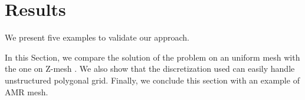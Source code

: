 \documentclass[preprint,10pt]{elsarticle}
\renewcommand{\(}{\left(}
\renewcommand{\)}{\right)}
\renewcommand{\[}{\left[}
\renewcommand{\]}{\right]}
\begin{document}
 
\section{Results} \label{sec:results}

We present five examples to validate our approach.  

In this Section, we compare the solution of the problem on an uniform mesh
with the one on Z-mesh \cite{Stone2003}. We also show that the
discretization used can easily handle unstructured polygonal grid. Finally, we
conclude this section with an example of AMR mesh.
\end{document}
